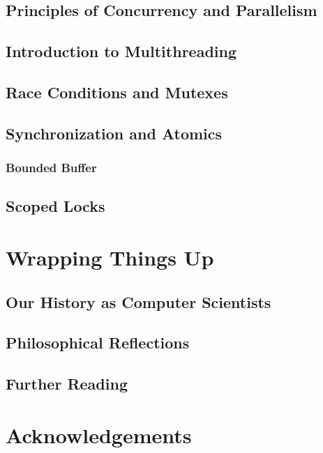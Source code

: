 \documentclass[a4paper, 12pt]{article}
\begin{document}
\subsection{Principles of Concurrency and Parallelism}
\subsection{Introduction to Multithreading}
\subsection{Race Conditions and Mutexes}
\subsection{Synchronization and Atomics}
\subsubsection{Bounded Buffer}
\subsection{Scoped Locks}

\newpage

\section{Wrapping Things Up}
\label{sec:ending}
\subsection{Our History as Computer Scientists}
\subsection{Philosophical Reflections}
\subsection{Further Reading}

\newpage

\section{Acknowledgements}
\label{sec:acknow}
\thispagestyle{empty}

\end{document}
